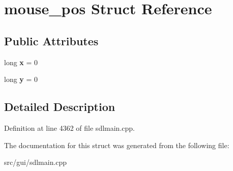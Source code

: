 \hypertarget{structmouse__pos}{\section{mouse\-\_\-pos Struct Reference}
\label{structmouse__pos}
}
\subsection*{Public Attributes}
\begin{DoxyCompactItemize}
\item 
\hypertarget{structmouse__pos_a87e6dd58ae6e8c7d1aabb6892b9d6f01}{long {\bfseries x} = 0}\label{structmouse__pos_a87e6dd58ae6e8c7d1aabb6892b9d6f01}

\item 
\hypertarget{structmouse__pos_a5c8305dffdd8ece94010679489de824d}{long {\bfseries y} = 0}\label{structmouse__pos_a5c8305dffdd8ece94010679489de824d}

\end{DoxyCompactItemize}


\subsection{Detailed Description}


Definition at line 4362 of file sdlmain.\-cpp.



The documentation for this struct was generated from the following file\-:\begin{DoxyCompactItemize}
\item 
src/gui/sdlmain.\-cpp\end{DoxyCompactItemize}
